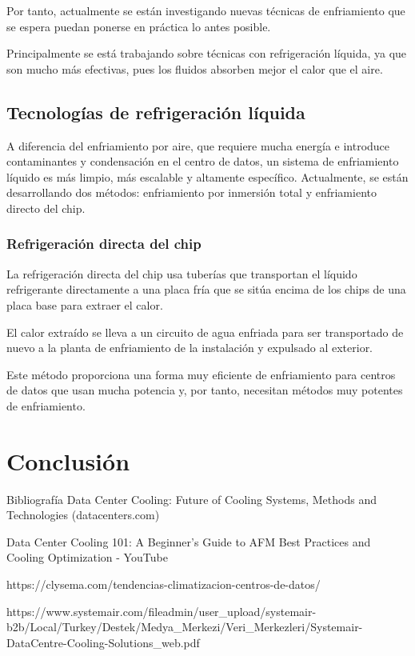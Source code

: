 Por tanto, actualmente se están investigando nuevas técnicas de enfriamiento que se espera puedan ponerse en práctica lo antes posible.

Principalmente se está trabajando sobre técnicas con refrigeración líquida, ya que son mucho más efectivas, pues los fluidos absorben mejor el calor que el aire.

\subsection*{Tecnologías de refrigeración líquida}

A diferencia del enfriamiento por aire, que requiere mucha energía e introduce contaminantes y condensación en el centro de datos, un sistema de enfriamiento líquido es más limpio, más escalable y altamente específico. Actualmente, se están desarrollando dos métodos: enfriamiento por inmersión total y enfriamiento directo del chip.

\subsubsection*{Refrigeración directa del chip}

La refrigeración directa del chip usa tuberías que transportan el líquido refrigerante directamente a una placa fría que se sitúa encima de los chips de una placa base para extraer el calor.

El calor extraído se lleva a un circuito de agua enfriada para ser transportado de nuevo a la planta de enfriamiento de la instalación  y expulsado al exterior.

Este método proporciona una forma muy eficiente de enfriamiento para centros de datos que usan mucha potencia y, por tanto, necesitan métodos muy potentes de enfriamiento.

\section*{Conclusión}



Bibliografía
Data Center Cooling: Future of Cooling Systems, Methods and Technologies (datacenters.com)

Data Center Cooling 101: A Beginner's Guide to AFM Best Practices and Cooling Optimization - YouTube

https://clysema.com/tendencias-climatizacion-centros-de-datos/

https://www.systemair.com/fileadmin/user_upload/systemair-b2b/Local/Turkey/Destek/Medya_Merkezi/Veri_Merkezleri/Systemair-DataCentre-Cooling-Solutions_web.pdf

